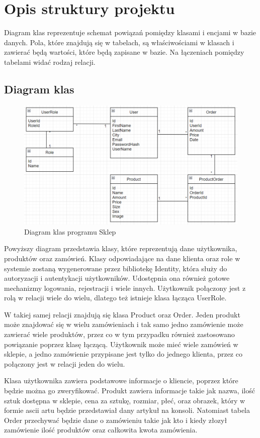 ﻿\chapter{Opis struktury projektu}
Diagram klas reprezentuje schemat powiązań pomiędzy klasami i encjami w bazie danych. Pola, które znajdują się w tabelach, są właściwościami w klasach i zawierać będą wartości, które będą zapisane w bazie. Na łączeniach pomiędzy tabelami widać rodzaj relacji.
\section{Diagram klas}
\begin{figure}[!ht]
	\centering
		\includegraphics[width=15cm]{diagram.png}
	\caption{\footnotesize Diagram klas programu Sklep}
	\label{fig:plotend}
\end{figure}

Powyższy diagram przedstawia klasy, które reprezentują dane użytkownika, produktów oraz zamówień. Klasy odpowiadające na dane klienta oraz role w systemie zostaną wygenerowane przez bibliotekę Identity, która służy do autoryzacji i autentykacji użytkowników. Udostępnia ona również gotowe mechanizmy logowania, rejestracji i wiele innych. Użytkownik połączony jest z rolą w relacji wiele do wielu, dlatego też istnieje klasa łącząca UserRole.\newline

W takiej samej relacji znajdują się klasa Product oraz Order. Jeden produkt może znajdować się w wielu zamówieniach i tak samo jedno zamówienie może zawierać wiele produktów, przez co w tym przypadku również zastosowano powiązanie poprzez klasę łączącą. Użytkownik może mieć wiele zamówień w sklepie, a jedno zamówienie przypisane jest tylko do jednego klienta, przez co połączony jest w relacji jeden do wielu.\newline

Klasa użytkownika zawiera podstawowe informacje o kliencie, poprzez które będzie można go zweryfikować. Produkt zawiera informacje takie jak nazwa, ilość sztuk dostępna w sklepie, cena za sztukę, rozmiar, płeć, oraz obrazek, który w formie ascii artu będzie przedstawiał dany artykuł na konsoli. Natomiast tabela Order przechywać będzie dane o zamówieniu takie jak kto i kiedy złozył zamówienie ilość produktów oraz całkowita kwota zamówienia.